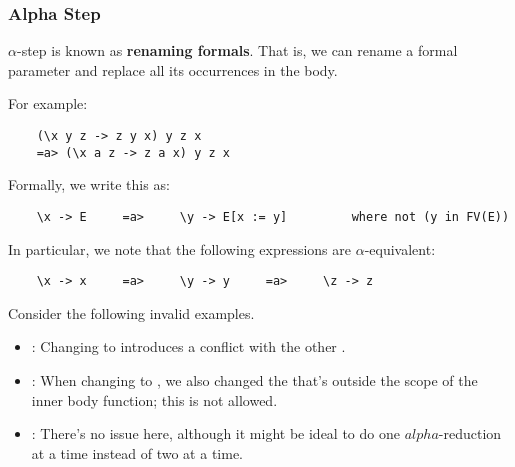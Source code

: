 \documentclass[letterpaper]{article}
\begin{document}
\subsubsection{Alpha Step}
$\alpha$-step is known as \textbf{renaming formals}. That is, we can rename a formal parameter and replace all its occurrences in the body.

\bigskip 

For example: 
\begin{verbatim}
    (\x y z -> z y x) y z x 
    =a> (\x a z -> z a x) y z x
\end{verbatim}

Formally, we write this as: 
\begin{verbatim}
    \x -> E     =a>     \y -> E[x := y]         where not (y in FV(E))
\end{verbatim}
In particular, we note that the following expressions are $\alpha$-equivalent: 
\begin{verbatim}
    \x -> x     =a>     \y -> y     =a>     \z -> z
\end{verbatim}
Consider the following invalid examples.
\begin{itemize}
    \item {}: Changing  to  introduces a conflict with the other .
    \item {}: When changing  to , we also changed the  that's outside the scope of the inner body function; this is not allowed. 
    \item {}: There's no issue here, although it might be ideal to do one $alpha$-reduction at a time instead of two at a time. 
\end{itemize}
\end{document}

